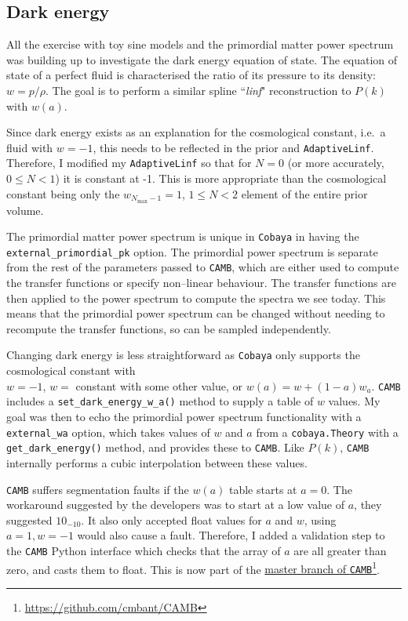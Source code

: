 \documentclass{article}
\begin{document}
\subsection{Dark energy}
\label{sec:de}

All the exercise with toy sine models and the primordial matter power spectrum was building up to investigate the dark energy equation of state. The equation of state of a perfect fluid is characterised the ratio of its pressure to its density: $w = p/\rho$. The goal is to perform a similar spline ``\textit{linf}" reconstruction to $P(k)$ with $w(a)$.

Since dark energy exists as an explanation for the cosmological constant, i.e.\ a fluid with $w=-1$, this needs to be reflected in the prior and \texttt{AdaptiveLinf}. Therefore, I modified my \texttt{AdaptiveLinf} so that for $N=0$ (or more accurately, $0\le N <1$) it is constant at -1. This is more appropriate than the cosmological constant being only the $w_{N_\textrm{max}-1} = 1$, $1\le N<2$ element of the entire prior volume.

The primordial matter power spectrum is unique in \texttt{Cobaya} in having the \texttt{external\_primordial\_pk} option. The primordial power spectrum is separate from the rest of the parameters passed to \texttt{CAMB}, which are either used to compute the transfer functions or specify non--linear behaviour. The transfer functions are then applied to the power spectrum to compute the spectra we see today. This means that the primordial power spectrum can be changed without needing to recompute the transfer functions, so can be sampled independently.

Changing dark energy is less straightforward as \texttt{Cobaya} only supports the cosmological constant with \\ $w=-1$, $w =$ constant with some other value, or $w(a) = w+(1-a)w_a$. \texttt{CAMB} includes a \texttt{set\_dark\_energy\_w\_a()} method to supply a table of $w$ values. My goal was then to echo the primordial power spectrum functionality with a \texttt{external\_wa} option, which takes values of $w$ and $a$ from a \texttt{cobaya.Theory} with a \texttt{get\_dark\_energy()} method, and provides these to \texttt{CAMB}. Like $P(k)$, \texttt{CAMB} internally performs a cubic interpolation between these values.

\texttt{CAMB} suffers segmentation faults if the $w(a)$ table starts at $a=0$. The workaround suggested by the developers was to start at a low value of $a$, they suggested $10_{-10}$. It also only accepted float values for $a$ and $w$, using $a=1, w=-1$ would also cause a fault. Therefore, I added a validation step to the \texttt{CAMB} Python interface which checks that the array of $a$ are all greater than zero, and casts them to float. This is now part of the \href{https://github.com/cmbant/CAMB}{master branch of \texttt{CAMB}}\footnote{\href{https://github.com/cmbant/CAMB}{https://github.com/cmbant/CAMB}}.
\end{document}
